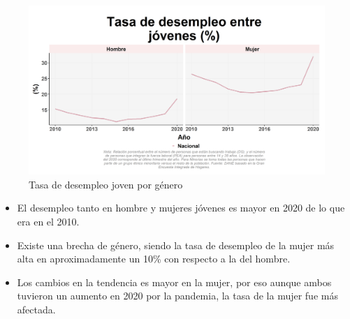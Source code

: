     \begin{figure}[H]
        \caption{Tasa de desempleo joven por género \label{map_result_2} }
        \begin{center}
        \includegraphics[width=\textwidth,keepaspectratio]{img/var_55_trend.png}
        \end{center}
    \end{figure}
            \begin{itemize}
                \item El desempleo tanto en hombre y mujeres jóvenes es mayor en 2020 de lo que era en el 2010.
                \item Existe una brecha de género, siendo la tasa de desempleo de la mujer más alta en aproximadamente un 10\% con respecto a la del hombre.
                \item Los cambios en la tendencia es mayor en la mujer, por eso aunque ambos tuvieron un aumento en 2020 por la pandemia, la tasa de la mujer fue más afectada.
                \end{itemize}

